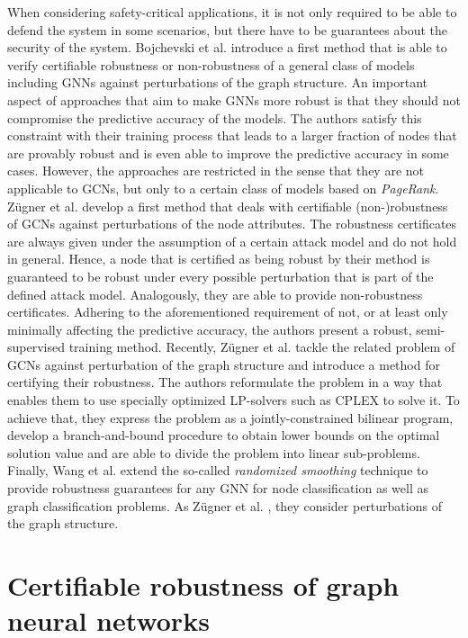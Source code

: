 \documentclass[a4paper,preprint]{sig-alternate}
\begin{document}
When considering safety-critical applications, it is not only required to be able to defend the system in some scenarios, but there
have to be guarantees about the security of the system.
Bojchevski et al. \cite{bojchevski2019certifiable} introduce a first method that is able to verify certifiable robustness or
non-robustness of a general class of models including GNNs against perturbations of the graph structure.
An important aspect of approaches that aim to make GNNs more robust is that they should not compromise the predictive accuracy of the models.
The authors satisfy this constraint with their training process that leads to a larger fraction of nodes that are provably robust
and is even able to improve the predictive accuracy in some cases.
However, the approaches are restricted in the sense that they are not applicable to GCNs, but only to a certain class of models
based on \textit{PageRank}. \cite{10.1145/3394486.3403217}
Zügner et al. \cite{Zuegner_2019} develop a first method that deals with certifiable (non-)robustness of GCNs against perturbations
of the node attributes. The robustness certificates are always given under the assumption of a certain attack model and do not hold in general.
Hence, a node that is certified as being robust by their method is guaranteed to be robust under every possible perturbation that is part of the
defined attack model. Analogously, they are able to provide non-robustness certificates.
Adhering to the aforementioned requirement of not, or at least only minimally affecting the predictive accuracy,
the authors present a robust, semi-supervised training method.
Recently, Zügner et al. \cite{10.1145/3394486.3403217} tackle the related problem of GCNs against perturbation of the graph structure
and introduce a method for certifying their robustness. The authors reformulate the problem in a way that enables them to use specially 
optimized LP-solvers such as CPLEX to solve it. To achieve that, they express the problem as a jointly-constrained bilinear program, 
develop a branch-and-bound procedure to obtain lower bounds on the optimal solution value and are able to divide the problem into linear 
sub-problems.
Finally, Wang et al.\cite{Wang_2020} extend the so-called \textit{randomized smoothing} technique to provide robustness guarantees for any
GNN for node classification as well as graph classification problems. As Zügner et al. \cite{10.1145/3394486.3403217}, they consider
perturbations of the graph structure.

\section{Certifiable robustness of graph neural networks}
\label{sec:main_section}
\end{document}
